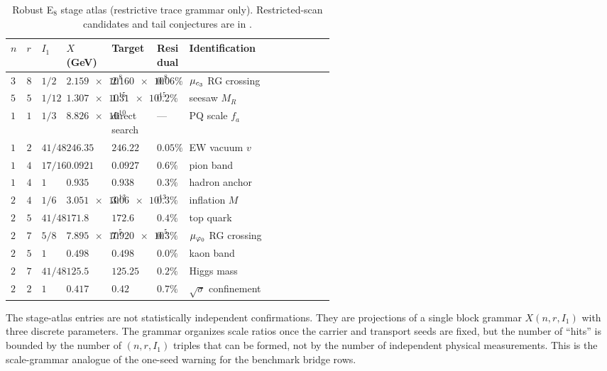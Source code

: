 \begin{table}[t]
\centering
\scriptsize
\setlength{\tabcolsep}{3pt}
\begin{tabularx}{\linewidth}{@{}>{\centering\arraybackslash}p{0.04\linewidth}>{\centering\arraybackslash}p{0.04\linewidth}>{\raggedright\arraybackslash}p{0.07\linewidth}>{\raggedleft\arraybackslash}p{0.14\linewidth}>{\raggedleft\arraybackslash}p{0.14\linewidth}>{\raggedright\arraybackslash}p{0.10\linewidth}Y@{}}
\toprule
$n$ & $r$ & $I_1$ & $X$ (GeV) & Target & Residual & Identification \\
\midrule
$3$ & $8$ & $1/2$ & $\num{2.159e8}$ & $\num{2.160e8}$ & $0.06\%$ & $\mu_{c_3}$ RG crossing \\
$5$ & $5$ & $1/12$ & $\num{1.307e15}$ & $\num{1.31e15}$ & $0.2\%$ & seesaw $M_R$ \\
$10$ & $1$ & $1/3$ & $\num{8.826e10}$ & direct search & --- & PQ scale $f_a$ \\
$12$ & $2$ & $41/48$ & $\num{246.35}$ & $\num{246.22}$ & $0.05\%$ & EW vacuum $v$ \\
$14$ & $4$ & $17/16$ & $\num{0.0921}$ & $\num{0.0927}$ & $0.6\%$ & pion band \\
$15$ & $4$ & $1$ & $\num{0.935}$ & $\num{0.938}$ & $0.3\%$ & hadron anchor \\
$21$ & $4$ & $1/6$ & $\num{3.051e13}$ & $\num{3.06e13}$ & $0.3\%$ & inflation $M$ \\
$21$ & $5$ & $41/48$ & $\num{171.8}$ & $\num{172.6}$ & $0.4\%$ & top quark \\
$24$ & $7$ & $5/8$ & $\num{7.895e5}$ & $\num{7.920e5}$ & $0.3\%$ & $\mu_{\varphi_0}$ RG crossing \\
$25$ & $5$ & $1$ & $\num{0.498}$ & $\num{0.498}$ & $0.0\%$ & kaon band \\
$25$ & $7$ & $41/48$ & $\num{125.5}$ & $\num{125.25}$ & $0.2\%$ & Higgs mass \\
$26$ & $2$ & $1$ & $\num{0.417}$ & $\num{0.42}$ & $0.7\%$ & $\sqrt{\sigma}$ confinement \\
\bottomrule
\end{tabularx}
\caption{Robust E$_8$ stage atlas (restrictive trace grammar only). Restricted-scan candidates and tail conjectures are in .}
\label{tab:e8-stage-atlas}
\end{table}

\begin{remark}
The stage-atlas entries are not statistically independent confirmations. They are projections of a single block grammar $X(n,r,I_1)$ with three discrete parameters. The grammar organizes scale ratios once the carrier and transport seeds are fixed, but the number of ``hits'' is bounded by the number of $(n,r,I_1)$ triples that can be formed, not by the number of independent physical measurements. This is the scale-grammar analogue of the one-seed warning for the benchmark bridge rows.
\end{remark}

